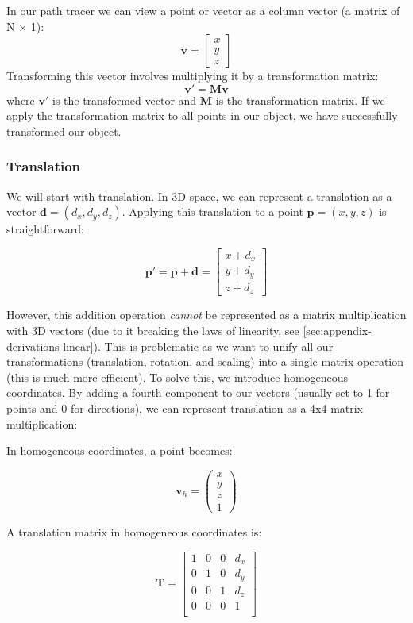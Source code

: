 \documentclass[12pt]{article}
\begin{document}
In our path tracer we can view a point or vector as a column vector (a matrix of N $\times$ 1):
\[
    \mathbf{v} = \begin{bmatrix} x \\ y \\ z \end{bmatrix}
\]
Transforming this vector involves multiplying it by a transformation matrix:
\[
    \mathbf{v}' = \mathbf{M} \mathbf{v}
\]
where \(\mathbf{v}'\) is the transformed vector and \(\mathbf{M}\) is the transformation matrix.
If we apply the transformation matrix to all points in our object, we have successfully transformed our object.

\subsubsection{Translation}

We will start with translation. In 3D space, we can represent a translation as a vector $\mathbf{d} = (d_x, d_y, d_z)$. Applying this translation to a point $\mathbf{p} = (x, y, z)$ is straightforward:

$$ \mathbf{p}' = \mathbf{p} + \mathbf{d} = \begin{bmatrix}
        x + d_x \\ y + d_y \\ z + d_z
    \end{bmatrix} $$

However, this addition operation \textit{cannot} be represented as a matrix multiplication with 3D vectors (due to it breaking the laws of linearity, see \autoref{sec:appendix-derivations-linear}). This is problematic as we want to unify all our transformations (translation, rotation, and scaling) into a single matrix operation (this is much more efficient).
To solve this, we introduce homogeneous coordinates. By adding a fourth component to our vectors (usually set to 1 for points and 0 for directions), we can represent translation as a 4x4 matrix multiplication:

In homogeneous coordinates, a point becomes:

\[
    \mathbf{v}_h = \begin{pmatrix} x \\ y \\ z \\ 1 \end{pmatrix}
\]

A translation matrix in homogeneous coordinates is:

\[
    \mathbf{T} = \begin{bmatrix}
        1 & 0 & 0 & d_x \\
        0 & 1 & 0 & d_y \\
        0 & 0 & 1 & d_z \\
        0 & 0 & 0 & 1   \\
    \end{bmatrix}
\]
\end{document}

